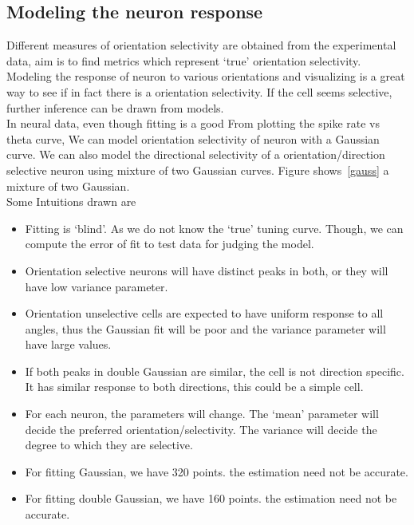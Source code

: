 \documentclass[11pt]{article}
\begin{document}
\subsection{Modeling the neuron response} %
\label{sub:modeling_the_neuron_response}
Different measures of orientation selectivity are obtained from the experimental data, aim is to find metrics which represent `true' orientation selectivity. Modeling the response of neuron to various orientations and visualizing is a great way to see if in fact there is a orientation selectivity. If the cell seems selective, further inference can be drawn from models.\\
In neural data, even though fitting is a good 
From plotting the spike rate vs theta curve, We can model orientation selectivity of neuron with a Gaussian curve. We can also model the directional selectivity of a orientation/direction selective neuron using mixture of two Gaussian curves. Figure shows~\ref{gauss} a mixture of two Gaussian.\\
Some Intuitions drawn are
\begin{itemize}
    \item Fitting is `blind'. As we do not know the `true' tuning curve. Though, we can compute the error of fit to test data for judging the model.
    \item Orientation selective neurons will have distinct peaks in both, or they will have low variance parameter.
    \item Orientation unselective cells are expected to have uniform response to all angles, thus the Gaussian fit will be poor and the variance parameter will have large values.
    \item If both peaks in double Gaussian are similar, the cell is not direction specific. It has similar response to both directions, this could be a simple cell.
    \item For each neuron, the parameters will change. The `mean' parameter will decide the preferred orientation/selectivity. The variance will decide the degree to which they are selective.
    \item For fitting Gaussian,  we have 320 points. the estimation need not be accurate.
    \item For fitting double Gaussian,  we have 160 points. the estimation need not be accurate.
\end{itemize}
\end{document}

